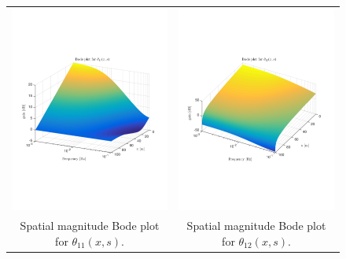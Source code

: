 \documentclass[preprint]{elsarticle}
\begin{document}
\begin{figure}
\centering
\begin{tabular}{cc}
\includegraphics[trim = 0mm 60mm 0mm 60mm, width = 8cm]{Bode_congested/distr_theta_11}
&
\includegraphics[trim = 0mm 60mm 0mm 60mm, width = 8cm]{Bode_congested/distr_theta_12}
\tabularnewline
Spatial magnitude Bode plot for $\theta_{11}(x,s)$.
&
Spatial magnitude Bode plot for $\theta_{12}(x,s)$.
\tabularnewline

\end{tabular}
\end{figure}
\end{document}
